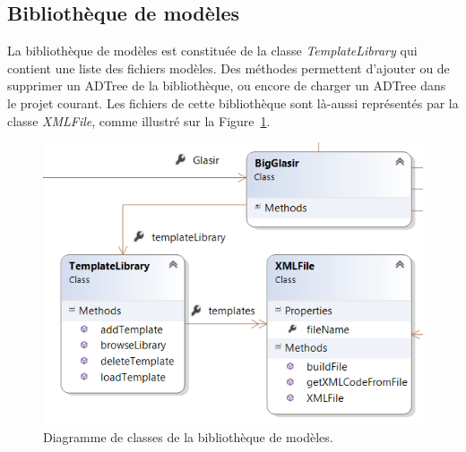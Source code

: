 	    
	\subsection{Bibliothèque de modèles}
    	\label{sec:diagClassBib}
    	La bibliothèque de modèles est constituée de la classe \emph{TemplateLibrary} qui contient une liste des fichiers modèles. Des méthodes permettent d'ajouter ou de supprimer un ADTree de la bibliothèque, ou encore de charger un ADTree dans le projet courant. Les fichiers de cette bibliothèque sont là-aussi représentés par la classe \emph{XMLFile}, comme illustré sur la {\sc Figure}~\ref{fig:lib}.
    	
    	\begin{figure}[H]
	        \centering
	        \includegraphics[height=0.5\textwidth]{figure/library.png}
	        \caption{Diagramme de classes de la bibliothèque de modèles.}
	        \label{fig:lib}
	    \end{figure}
